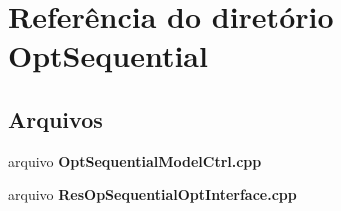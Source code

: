 \section{Referência do diretório Opt\+Sequential}
\label{dir_1f1002459bdcd25cbf00d57ef754ca96}
\subsection*{Arquivos}
\begin{DoxyCompactItemize}
\item 
arquivo {\bf Opt\+Sequential\+Model\+Ctrl.\+cpp}
\item 
arquivo {\bf Res\+Op\+Sequential\+Opt\+Interface.\+cpp}
\end{DoxyCompactItemize}
